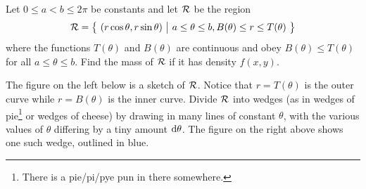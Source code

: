 \begin{eg}[Mass]\label{eg polar mass}
Let $0\le a<b\le 2\pi$ be constants and let $\mathcal{R}$ be the region
\begin{equation*}
\mathcal{R}=\big\{ \ (r\cos\theta,r\sin\theta)\ \big|\ a\le\theta\le b, 
               B(\theta)\le r\le T(\theta)\ \big\}
\end{equation*}
where the functions $T(\theta)$ and $B(\theta)$ are continuous and obey
$B(\theta)\le T(\theta)$ for all $a\le\theta\le b$.
Find the mass of $\mathcal{R}$ if it has density $f(x,y)$.

\soln 
The figure on the left below is a sketch of $\mathcal{R}$. Notice that $r=T(\theta)$
is the outer curve while $r=B(\theta)$ is the inner curve.
Divide $\mathcal{R}$ into wedges (as in wedges of pie\footnote{There is a pie/pi/pye
pun in there somewhere.} or wedges of cheese)
by drawing in many lines of constant $\theta$, with the various
values of $\theta$ differing by a tiny amount $\mathrm{d}\theta$.
The figure on the right above shows one such wedge, outlined in blue.


\end{eg}
